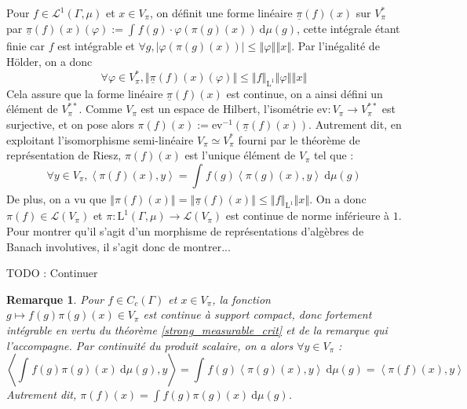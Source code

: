 \documentclass[a4paper,12pt]{article}
\newtheorem{remark}[theorem]{Remarque}
\newcommand{\ev}{\mathrm{ev}}
\newcommand{\norm}[1]{\left\Vert #1\right\Vert}
\newcommand{\abs}[1]{\left\vert#1\right\vert}
\newcommand{\ket}[1]{\left\langle #1 \right\rangle}
\newcommand{\integral}[4]{\int_{#1}^{#2} #3~\mathrm{d}#4}
\newcommand{\inv}{^{-1}}
\newcommand{\TODO}[1]{{\color{red}TODO :} #1}
\begin{document}
Pour $f\in\mathscr{L}^1(\Gamma, \mu)$ et $x\in V_\pi$, on définit une forme linéaire $\underline{\pi}(f)(x)$ sur $V_\pi^*$ par 
$\underline{\pi}(f)(x)(\varphi) := \integral{}{}{f(g)\cdot\varphi(\pi(g)(x))}{\mu(g)}$, cette intégrale étant finie car $f$ est
intégrable et $\forall g, \abs{\varphi(\pi(g)(x))}\le\norm{\varphi}\norm{x}$. Par l'inégalité de Hölder, on a donc 
\begin{equation*}
    \forall\varphi\in V_\pi^*, \norm{\underline{\pi}(f)(x)(\varphi)}\le\norm{f}_{\mathrm{L}^1}\norm{\varphi}\norm{x}
\end{equation*}
Cela assure que la forme linéaire $\underline{\pi}(f)(x)$ est continue, on a ainsi défini un élément de $V_\pi^{**}$. 
Comme $V_\pi$ est un espace de Hilbert, l'isométrie $\ev:V_\pi\to V_\pi^{**}$ est surjective, et on pose alors $\pi(f)(x) := \ev\inv(\underline{\pi}(f)(x))$. 
Autrement dit, en exploitant l'isomorphisme semi-linéaire $V_\pi\simeq V_\pi^*$ fourni par le théorème de représentation de Riesz, 
$\pi(f)(x)$ est l'unique élément de $V_\pi$ tel que :
\begin{equation*}
    \forall y\in V_\pi, \ket{\pi(f)(x), y} = \integral{}{}{f(g)\ket{\pi(g)(x), y}}{\mu(g)}
\end{equation*}
De plus, on a vu que $\norm{\pi(f)(x)} = \norm{\underline{\pi}(f)(x)} \le \norm{f}_{\mathrm{L}^1}\norm{x}$. 
On a donc $\pi(f)\in\mathcal{L}(V_\pi)$ et $\pi:\mathrm{L}^1(\Gamma, \mu)\to\mathcal{L}(V_\pi)$ est continue de norme inférieure à $1$.
Pour montrer qu'il s'agit d'un morphisme de représentations d'algèbres de Banach involutives, il s'agit donc de montrer...

\TODO{Continuer}

\begin{remark}\label{L1_repr_Cc}
    Pour $f\in C_c(\Gamma)$ et $x\in V_\pi$, la fonction $g\mapsto f(g)\pi(g)(x)\in V_\pi$ est continue à support compact,
    donc fortement intégrable en vertu du théorème \ref{strong_measurable_crit} et de la remarque qui l'accompagne. 
    Par continuité du produit scalaire, on a alors $\forall y\in V_\pi$ : 
    \begin{equation*}
        \ket{\integral{}{}{f(g)\pi(g)(x)}{\mu(g)}, y} = \integral{}{}{f(g)\ket{\pi(g)(x), y}}{\mu(g)} = \ket{\pi(f)(x), y}
    \end{equation*}
    Autrement dit, $\pi(f)(x) = \integral{}{}{f(g)\pi(g)(x)}{\mu(g)}$.
\end{remark}
\end{document}
